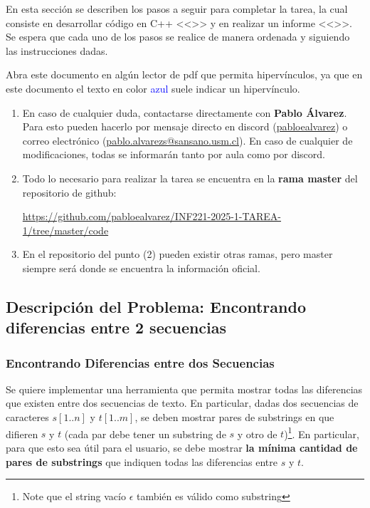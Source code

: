 En esta sección se describen los pasos a seguir para completar la tarea, la cual consiste en desarrollar código en C++ <<>> y en realizar un informe <<>>. Se espera que cada uno de los pasos se realice de manera ordenada y siguiendo las instrucciones dadas.

\begin{mdframed}
    Abra este documento en algún lector de pdf que permita hipervínculos, ya que en este documento el texto en color \textcolor{blue}{azul} suele indicar un hipervínculo.
\end{mdframed}

\begin{enumerate}[(1)]
    \item 
    En caso de cualquier duda, contactarse directamente con \textbf{Pablo Álvarez}. Para esto pueden hacerlo por mensaje directo en discord (\url{pabloealvarez}) o correo electrónico (\url{pablo.alvarezs@sansano.usm.cl}). En caso de cualquier de modificaciones, todas se informarán tanto por aula como por discord.
    \item Todo lo necesario para realizar la tarea se encuentra en la \textbf{rama master} del repositorio de github:
\begin{center}

    \url{https://github.com/pabloealvarez/INF221-2025-1-TAREA-1/tree/master/code}
        
\end{center}
\item En el repositorio del punto (2) pueden existir otras ramas, pero master siempre será donde se encuentra la información oficial.
\end{enumerate}

\subsection{Descripción del Problema: Encontrando diferencias entre 2 secuencias}
\subsubsection{Encontrando Diferencias entre dos Secuencias}

Se quiere implementar una herramienta que permita mostrar todas las diferencias que existen entre dos secuencias de texto. En particular, dadas dos secuencias de caracteres $s[1{..}n]$ y $t[1{..}m]$, se deben mostrar pares de substrings en que difieren $s$ y $t$ (cada par debe tener un substring de $s$  y otro de $t$)\footnote{Note que el string vacío $\epsilon$ también es válido como substring}. En particular, para que esto sea útil para el usuario, se debe mostrar \textbf{la mínima cantidad de pares de substrings} que indiquen todas las diferencias entre $s$ y $t$. 

